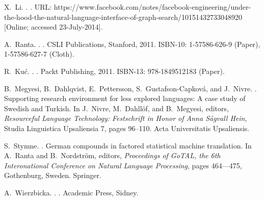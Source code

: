 
% 

\begin{thebibliography}{}

X.~Li.
.
.
\newblock URL: https://www.facebook.com/notes/facebook-engineering/under-the-hood-the-natural-language-interface-of-graph-search/10151432733048920 [Online; accessed 23-July-2014].

A.~Ranta.
.
.
\newblock CSLI Publications, Stanford, 2011.
\newblock ISBN-10: 1-57586-626-9 (Paper), 1-57586-627-7 (Cloth).

R.~Kuć.
.
.
\newblock Packt Publishing, 2011.
\newblock ISBN-13: 978-1849512183 (Paper).

B.~Megyesi, B.~Dahlqvist, E.~Pettersson, S.~Gustafson-Capkov\'a, and J.~Nivre.
.
\newblock Supporting research environment for less explored languages: A case
  study of {S}wedish and {T}urkish.
\newblock In J.~Nivre, M.~Dahll\"of, and B.~Megyesi, editors, {\em Resourceful
  Language Technology: Festschrift in Honor of Anna S\aa{}gvall Hein}, Studia
  Linguistica Upsaliensia 7, pages 96--110. Acta Universitatis Upsaliensis.

S.~Stymne.
.
\newblock German compounds in factored statistical machine translation.
\newblock In A.~Ranta and B.~Nordstr\"om, editors, {\em Proceedings of GoTAL,
  the 6th Interonational Conference on Natural Language Processing}, pages
  464–--475, Gothenburg, Sweden. Springer.

A.~Wierzbicka.
.
.
\newblock Academic Press, Sidney.


\end{thebibliography}